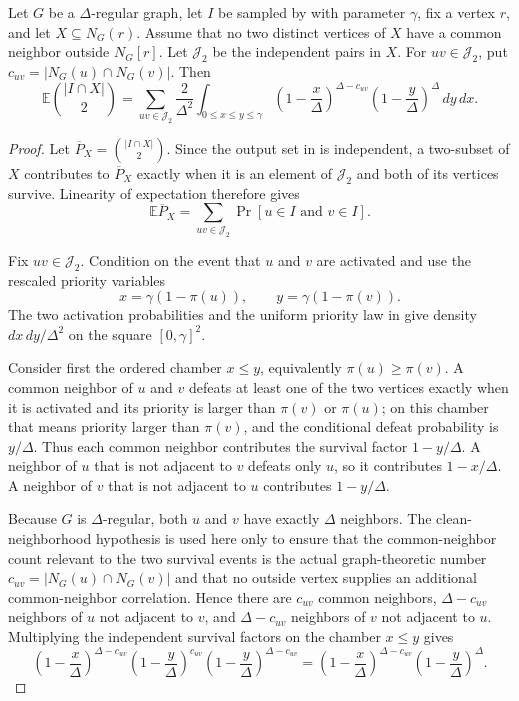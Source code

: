 \begin{lemma}
Let $G$ be a $\Delta$-regular graph, let $I$ be sampled by
 with parameter $\gamma$, fix a vertex
$r$, and let $X\subseteq N_G(r)$.  Assume that no two distinct vertices of
$X$ have a common neighbor outside $N_G[r]$.  Let $\mathcal J_2$ be the
independent pairs in $X$.  For $uv\in\mathcal J_2$, put
$c_{uv}=|N_G(u)\cap N_G(v)|$.  Then
\[
\mathbb E\binom{|I\cap X|}{2}
=
\sum_{uv\in\mathcal J_2}
\frac{2}{\Delta^2}
\int_{0\le x\le y\le\gamma}
\left(1-\frac{x}{\Delta}\right)^{\Delta-c_{uv}}
\left(1-\frac{y}{\Delta}\right)^\Delta\,dy\,dx .
\]
\end{lemma}
\begin{proof}
Let $\overline P_X=\binom{|I\cap X|}{2}$.  Since the output set in
 is independent, a two-subset of $X$
contributes to $\overline P_X$ exactly when it is an element of
$\mathcal J_2$ and both of its vertices survive.  Linearity of expectation
therefore gives
\[
\mathbb E\overline P_X
=\sum_{uv\in\mathcal J_2}\Pr[u\in I\text{ and }v\in I].
\]

Fix $uv\in\mathcal J_2$.  Condition on the event that $u$ and $v$ are
activated and use the rescaled priority variables
\[
x=\gamma(1-\pi(u)),\qquad y=\gamma(1-\pi(v)).
\]
The two activation probabilities and the uniform priority law in
 give density
$dx\,dy/\Delta^2$ on the square $[0,\gamma]^2$.

Consider first the ordered chamber $x\le y$, equivalently
$\pi(u)\ge\pi(v)$.  A common neighbor of $u$ and $v$ defeats at least one of
the two vertices exactly when it is activated and its priority is larger than
$\pi(v)$ or $\pi(u)$; on this chamber that means priority larger than
$\pi(v)$, and the conditional defeat probability is $y/\Delta$.  Thus each
common neighbor contributes the survival factor $1-y/\Delta$.  A neighbor
of $u$ that is not adjacent to $v$ defeats only $u$, so it contributes
$1-x/\Delta$.  A neighbor of $v$ that is not adjacent to $u$ contributes
$1-y/\Delta$.

Because $G$ is $\Delta$-regular, both $u$ and $v$ have exactly $\Delta$
neighbors.  The clean-neighborhood hypothesis is used here only to ensure
that the common-neighbor count relevant to the two survival events is the
actual graph-theoretic number $c_{uv}=|N_G(u)\cap N_G(v)|$ and that no
outside vertex supplies an additional common-neighbor correlation.  Hence
there are $c_{uv}$ common neighbors, $\Delta-c_{uv}$ neighbors of $u$ not
adjacent to $v$, and $\Delta-c_{uv}$ neighbors of $v$ not adjacent to $u$.
Multiplying the independent survival factors on the chamber $x\le y$ gives
\[
\left(1-\frac{x}{\Delta}\right)^{\Delta-c_{uv}}
\left(1-\frac{y}{\Delta}\right)^{c_{uv}}
\left(1-\frac{y}{\Delta}\right)^{\Delta-c_{uv}}
=
\left(1-\frac{x}{\Delta}\right)^{\Delta-c_{uv}}
\left(1-\frac{y}{\Delta}\right)^\Delta .
\]


\end{proof}
